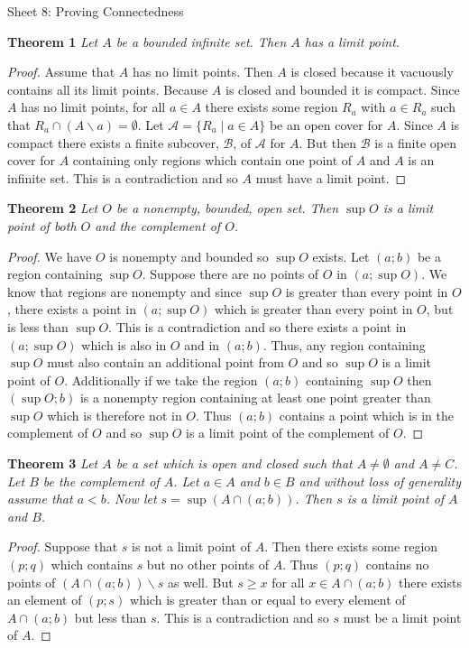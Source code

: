 \documentclass{article}
\begin{document}
\begin{flushleft}

\Large

Sheet 8: Proving Connectedness\newline

\normalsize

\textbf{Theorem 1}
\textsl{Let $A$ be a bounded infinite set. Then $A$ has a limit point.}
\begin{proof}
Assume that $A$ has no limit points. Then $A$ is closed because it vacuously contains all its limit points. Because $A$ is closed and bounded it is compact. Since $A$ has no limit points, for all $a \in A$ there exists some region $R_a$ with $a \in R_a$ such that $R_a \cap (A \backslash a) = \emptyset$. Let $\mathcal{A} = \{R_a \mid a \in A\}$ be an open cover for $A$. Since $A$ is compact there exists a finite subcover, $\mathcal{B}$, of $\mathcal{A}$ for $A$. But then $\mathcal{B}$ is a finite open cover for $A$ containing only regions which contain one point of $A$ and $A$ is an infinite set. This is a contradiction and so $A$ must have a limit point.
\end{proof}

\textbf{Theorem 2}
\textsl{Let $O$ be a nonempty, bounded, open set. Then $\sup O$ is a limit point of both $O$ and the complement of $O$.}
\begin{proof}
We have $O$ is nonempty and bounded so $\sup O$ exists. Let $(a;b)$ be a region containing $\sup O$. Suppose there are no points of $O$ in $(a;\sup O)$. We know that regions are nonempty and since $\sup O$ is greater than every point in $O$, there exists a point in $(a; \sup O)$ which is greater than every point in $O$, but is less than $\sup O$. This is a contradiction and so there exists a point in $(a; \sup O)$ which is also in $O$ and in $(a;b)$. Thus, any region containing $\sup O$ must also contain an additional point from $O$ and so $\sup O$ is a limit point of $O$. Additionally if we take the region $(a;b)$ containing $\sup O$ then $(\sup O;b)$ is a nonempty region containing at least one point greater than $\sup O$ which is therefore not in $O$. Thus $(a;b)$ contains a point which is in the complement of $O$ and so $\sup O$ is a limit point of the complement of $O$.
\end{proof}

\textbf{Theorem 3}
\textsl{Let $A$ be a set which is open and closed such that $A \neq \emptyset$ and $A \neq C$. Let $B$ be the complement of $A$. Let $a \in A$ and $b \in B$ and without loss of generality assume that $a < b$. Now let $s = \sup (A \cap (a;b))$. Then $s$ is a limit point of $A$ and $B$.}
\begin{proof}
Suppose that $s$ is not a limit point of $A$. Then there exists some region $(p;q)$ which contains $s$ but no other points of $A$. Thus $(p;q)$ contains no points of $(A \cap (a;b)) \backslash s$ as well. But $s \geq x$ for all $x \in A \cap (a;b)$ there exists an element of $(p;s)$ which is greater than or equal to every element of $A \cap (a;b)$ but less than $s$. This is a contradiction and so $s$ must be a limit point of $A$.\newline


\end{proof}
\end{flushleft}
\end{document}
